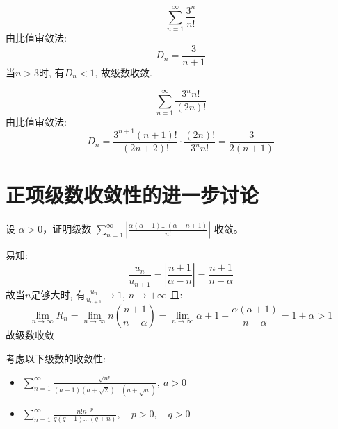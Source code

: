 \[
    \sum_{n=1}^{\infty} \frac{3^n}{n!}
\]
由比值审敛法:
\[
    D_{n} = \frac{3}{n+1}
\]
当\(n>3\)时, 有\(D_{n} < 1\), 故级数收敛.

\[
    \sum_{n=1}^{\infty} \frac{3^{n}n!}{(2n)!}
\]
由比值审敛法:
\[
    D_{n} = \frac{3^{n+1}(n+1)!}{(2n+2)!} \cdot \frac{(2n)!}{3^{n}n!}
    = \frac{3}{2(n+1)}
\]

\section{正项级数收敛性的进一步讨论}

\begin{problem}
    设 \(\alpha > 0\)，证明级数 \(\sum_{n=1}^{\infty} \left|
        \frac{\alpha(\alpha - 1) \dots (\alpha - n + 1)}{n!}
    \right| \) 收敛。
\end{problem}

\begin{solution}
    易知: \[
        \frac{u_{n}}{u_{n+1}}= \left| \frac{n+1}{\alpha-n} \right| =
        \frac{n+1}{n-\alpha}
    \]
    故当\(n\)足够大时, 有\(\frac{u_{n}}{u_{n+1}}\to 1\), \(n \to +\infty\)
    且:
    \[
        \lim_{n \to \infty} R_{n} = \lim_{n \to \infty} n \left(
        \frac{n+1}{n-\alpha} \right)
        =\lim_{n \to \infty} \alpha +1 +
        \frac{\alpha(\alpha+1)}{n-\alpha} = 1+\alpha > 1
    \]
    故级数收敛
\end{solution}

\begin{problem}
    考虑以下级数的收敛性:
    \begin{itemize}
        \item \(\sum_{n=1}^{\infty}
                \frac{\sqrt{n!}}{(a+1)(a+\sqrt{2}) \dots
            (a+\sqrt{n})}, \ a > 0\)
        \item \(\sum_{n=1}^{\infty} \frac{n!n^{-p}}{q(q+1)
                \dots (q+n)},
            \quad p > 0, \quad q > 0\)
    \end{itemize}
\end{problem}

